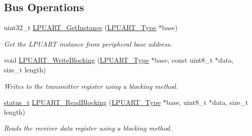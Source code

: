 \subsection*{Bus Operations}
\begin{DoxyCompactItemize}
\item 
uint32\+\_\+t \mbox{\hyperlink{group__lpuart__driver_gaaf4c8ce1f1730cdbf094931033d9b52c}{L\+P\+U\+A\+R\+T\+\_\+\+Get\+Instance}} (\mbox{\hyperlink{struct_l_p_u_a_r_t___type}{L\+P\+U\+A\+R\+T\+\_\+\+Type}} $\ast$base)
\begin{DoxyCompactList}\small\item\em Get the L\+P\+U\+A\+RT instance from peripheral base address. \end{DoxyCompactList}\item 
void \mbox{\hyperlink{group__lpuart__driver_gac5377aeebf4327f4ef9de295d8695cd9}{L\+P\+U\+A\+R\+T\+\_\+\+Write\+Blocking}} (\mbox{\hyperlink{struct_l_p_u_a_r_t___type}{L\+P\+U\+A\+R\+T\+\_\+\+Type}} $\ast$base, const uint8\+\_\+t $\ast$data, size\+\_\+t length)
\begin{DoxyCompactList}\small\item\em Writes to the transmitter register using a blocking method. \end{DoxyCompactList}\item 
\mbox{\hyperlink{group__ksdk__common_gaaabdaf7ee58ca7269bd4bf24efcde092}{status\+\_\+t}} \mbox{\hyperlink{group__lpuart__driver_gae76aba14dbfe94124082785e2c0ecd9d}{L\+P\+U\+A\+R\+T\+\_\+\+Read\+Blocking}} (\mbox{\hyperlink{struct_l_p_u_a_r_t___type}{L\+P\+U\+A\+R\+T\+\_\+\+Type}} $\ast$base, uint8\+\_\+t $\ast$data, size\+\_\+t length)
\begin{DoxyCompactList}\small\item\em Reads the receiver data register using a blocking method. \end{DoxyCompactList}\end{DoxyCompactItemize}
